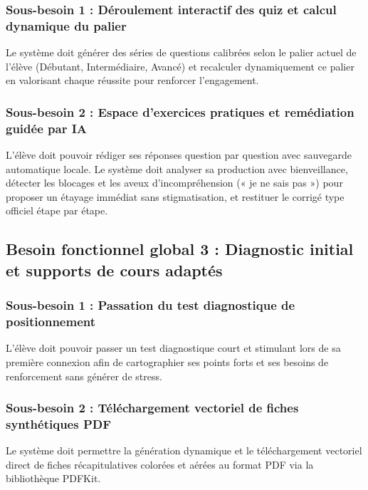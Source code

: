 \documentclass[12pt,a4paper]{report}
\begin{document}
\subsubsection{Sous-besoin 1 : Déroulement interactif des quiz et calcul dynamique du palier}
Le système doit générer des séries de questions calibrées selon le palier actuel de l'élève (Débutant, Intermédiaire, Avancé) et recalculer dynamiquement ce palier en valorisant chaque réussite pour renforcer l'engagement.

\subsubsection{Sous-besoin 2 : Espace d'exercices pratiques et remédiation guidée par IA}
L'élève doit pouvoir rédiger ses réponses question par question avec sauvegarde automatique locale. Le système doit analyser sa production avec bienveillance, détecter les blocages et les aveux d'incompréhension (« je ne sais pas ») pour proposer un étayage immédiat sans stigmatisation, et restituer le corrigé type officiel étape par étape.

\subsection{Besoin fonctionnel global 3 : Diagnostic initial et supports de cours adaptés}
\subsubsection{Sous-besoin 1 : Passation du test diagnostique de positionnement}
L'élève doit pouvoir passer un test diagnostique court et stimulant lors de sa première connexion afin de cartographier ses points forts et ses besoins de renforcement sans générer de stress.

\subsubsection{Sous-besoin 2 : Téléchargement vectoriel de fiches synthétiques PDF}
Le système doit permettre la génération dynamique et le téléchargement vectoriel direct de fiches récapitulatives colorées et aérées au format PDF via la bibliothèque PDFKit.
\end{document}
